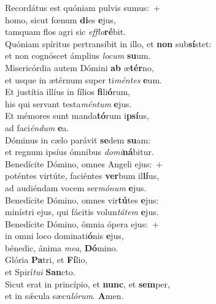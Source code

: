 \evenverse Recordátus est quóniam pulvis sumus:~+\\\evenverse  homo, sicut fœnum \textbf{di}es \textbf{e}jus,~\*\\
\evenverse tamquam flos agri sic \textit{ef}\textit{flo}\textbf{ré}bit.\\
\oddverse Quóniam spíritus pertransíbit in illo, et \textbf{non} sub\textbf{sí}stet:~\*\\
\oddverse et non cognóscet ámplius \textit{lo}\textit{cum} \textbf{su}um.\\
\evenverse Misericórdia autem Dómini \textbf{ab} æ\textbf{tér}no,~\*\\
\evenverse et usque in ætérnum super ti\textit{mén}\textit{tes} \textbf{e}um.\\
\oddverse Et justítia illíus in fílios \textbf{fi}li\textbf{ó}rum,~\*\\
\oddverse his qui servant testa\textit{mén}\textit{tum} \textbf{e}jus.\\
\evenverse Et mémores sunt manda\textbf{tó}rum i\textbf{psí}us,~\*\\
\evenverse ad faci\textit{én}\textit{dum} \textbf{e}a.\\
\oddverse Dóminus in cælo parávit \textbf{se}dem \textbf{su}am:~\*\\
\oddverse et regnum ipsíus ómnibus \textit{do}\textit{mi}\textbf{ná}bitur.\\
\evenverse Benedícite Dómino, omnes Angeli ejus:~+\\
\evenverse  poténtes virtúte, faciéntes \textbf{ver}bum il\textbf{lí}us,~\*\\
\evenverse ad audiéndam vocem ser\textit{mó}\textit{num} \textbf{e}jus.\\
\oddverse Benedícite Dómino, omnes vir\textbf{tú}tes \textbf{e}jus:~\*\\
\oddverse minístri ejus, qui fácitis volun\textit{tá}\textit{tem} \textbf{e}jus.\\
\evenverse Benedícite Dómino, ómnia ópera ejus:~+\\
\evenverse  in omni loco dominati\textbf{ó}nis \textbf{e}jus,~\*\\
\evenverse bénedic, ánima \textit{me}\textit{a}, \textbf{Dó}mino.\\
\oddverse Glória \textbf{Pa}tri, et \textbf{Fí}lio,~\*\\
\oddverse et Spirí\textit{tu}\textit{i} \textbf{San}cto.\\
\evenverse Sicut erat in princípio, et \textbf{nunc}, et \textbf{sem}per,~\*\\
\evenverse et in sǽcula sæcu\textit{ló}\textit{rum}. \textbf{A}men.\\

